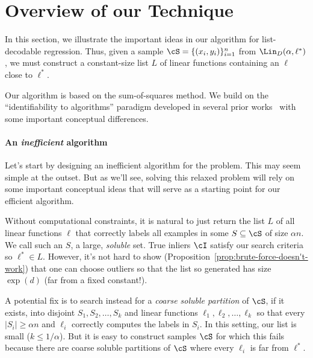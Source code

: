 



\section{Overview of our Technique} \label{sec:overview}
In this section, we illustrate the important ideas in our algorithm for list-decodable regression. 
Thus, given a sample $\cS = \{(x_i,y_i)\}_{i = 1}^n$ from $\Lin_D(\alpha,\ell^*)$, we must construct a constant-size list $L$ of linear functions containing an $\ell$ close to $\ell^*$. 

Our algorithm is based on the sum-of-squares method. We build on the ``identifiability to algorithms'' paradigm developed in several prior works~\cite{DBLP:conf/colt/BarakM16,MR3388192-Barak15,DBLP:conf/focs/MaSS16,2017KS,HopkinsLi17,KothariSteinhardt17,DBLP:conf/colt/KlivansKM18} with some important conceptual differences. 

\paragraph{An \emph{inefficient} algorithm} Let's start by designing an inefficient algorithm for the problem. This may seem simple at the outset. But as we'll see, solving this relaxed problem will rely on some important conceptual ideas that will serve as a starting point for our efficient algorithm. 

Without computational constraints, it is natural to just return the list $L$ of all linear functions $\ell$ that correctly labels all examples in some $S \subseteq \cS$ of size $\alpha n$. We call such an $S$, a large, \emph{soluble} set. True inliers $\cI$ satisfy our search criteria so $\ell^* \in L$. However, it's not hard to show (Proposition~\ref{prop:brute-force-doesn't-work}) that one can choose outliers so that the list so generated has size $\exp(d)$ (far from a fixed constant!).

A potential fix is to search instead for a \emph{coarse soluble partition} of $\cS$, if it exists, into disjoint $S_1, S_2,\ldots, S_k$ and  linear functions $\ell_1, \ell_2, \ldots, \ell_k$ so that every $|S_i| \geq \alpha n$ and $\ell_i$ correctly computes the labels in $S_i$. In this setting, our list is small ($k\leq 1/\alpha$). But it is easy to construct samples $\cS$ for which this fails 
because there are coarse soluble partitions of $\cS$ where every $\ell_i$ is far from $\ell^*$. %
